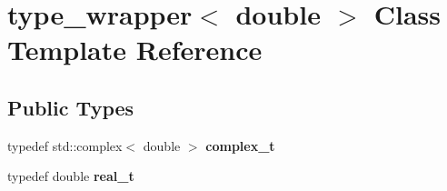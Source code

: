\hypertarget{classtype__wrapper_3_01double_01_4}{}\section{type\+\_\+wrapper$<$ double $>$ Class Template Reference}
\label{classtype__wrapper_3_01double_01_4}
\subsection*{Public Types}
\begin{DoxyCompactItemize}
\item 
\hypertarget{classtype__wrapper_3_01double_01_4_aa2dc3291ffb038a5f0d655c7a92b4cfc}{}typedef std\+::complex$<$ double $>$ {\bfseries complex\+\_\+t}\label{classtype__wrapper_3_01double_01_4_aa2dc3291ffb038a5f0d655c7a92b4cfc}

\item 
\hypertarget{classtype__wrapper_3_01double_01_4_a796f65ee644d58a57befa3909733adc6}{}typedef double {\bfseries real\+\_\+t}\label{classtype__wrapper_3_01double_01_4_a796f65ee644d58a57befa3909733adc6}

\end{DoxyCompactItemize}
